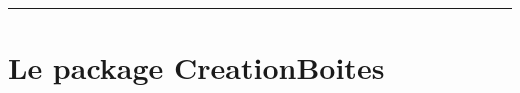 \documentclass[french,11pt,a4paper]{article}
\begin{document}
\begin{tcolorbox}[colframe=lightgray,colback=white]
\begin{BoiteDeDemo}
	\lipsum[1][1]
\end{BoiteDeDemo}

\begin{BoiteDeDemo}[Compteur=false]
	\lipsum[1][1]
\end{BoiteDeDemo}

\begin{BoiteDeDemo}[Pluriel]
	\lipsum[1][1]
\end{BoiteDeDemo}

\begin{BoiteDeDemo}[SousTitre={Un petit sous-titre}]
	\lipsum[1][1]
\end{BoiteDeDemo}

\begin{BoiteDeDemo}[ComplementTitre={ - Un complément de titre}]%
	\lipsum[1][1]
\end{BoiteDeDemo}

\begin{BoiteDeDemo}[ModifLabel={ super important}]%
	\lipsum[1][1]
\end{BoiteDeDemo}

\begin{BoiteDeDemo}[Logo={example-image}]
	\lipsum[1][1]
\end{BoiteDeDemo}

\begin{BoiteDeDemo}[Icone={\faLightbulb}]
	\lipsum[1][1]
\end{BoiteDeDemo}

\begin{BoiteDanger}[Compteur=false]
	\lipsum[1][1]
\end{BoiteDanger}
\end{tcolorbox}

\vfill~

\pagebreak


\hypertarget{matoc}{}

\tableofcontents

\vspace*{5mm}

\hrule

\vspace*{5mm}

\section{Le package CreationBoites}
\end{document}
